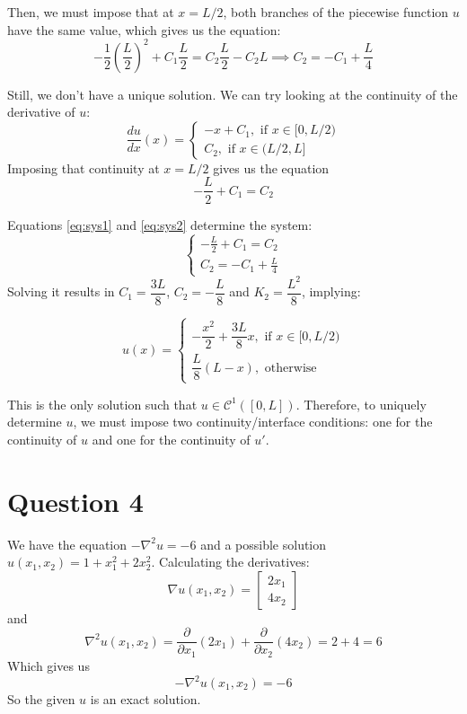 \documentclass[12pt]{article}
\begin{document}
    Then, we must impose that at $x=L/2$, both branches of the piecewise function $u$ have the same value, which gives us the equation:
    \begin{equation}
        \label{eq:sys1}
        -\frac{1}{2} \left(\frac{L}{2} \right)^2 + C_1\frac{L}{2} = C_2\frac{L}{2} - C_2L \implies C_2 = -C_1 + \frac{L}{4}
    \end{equation}

    Still, we don't have a unique solution. We can try looking at the continuity of the derivative of $u$:
    \[
        \frac{du}{dx}(x)= \begin{cases}
            -x + C_1, \text{ if }x \in [0,L/2) \\
            C_2, \text{ if }x \in (L/2,L]
        \end{cases}
    \]
    Imposing that continuity at $x=L/2$ gives us the equation
    \begin{equation}
    \label{eq:sys2}
        -\frac{L}{2} + C_1 = C_2
    \end{equation}

    Equations \ref{eq:sys1} and \ref{eq:sys2} determine the system:
    \begin{equation}
        \begin{cases}
            -\frac{L}{2} + C_1 = C_2 \\
            C_2 = -C_1 + \frac{L}{4}
        \end{cases}
    \end{equation}
    Solving it results in $C_1 = \dfrac{3L}{8}$, $C_2 = -\dfrac{L}{8}$ and $K_2 = \dfrac{L^2}{8}$, implying:

    \begin{equation}
        u(x) = \begin{cases}
            -\dfrac{x^2}{2} + \dfrac{3L}{8}x , \text{ if }x \in [0,L/2) \\
            \dfrac{L}{8}(L-x), \text{ otherwise}
        \end{cases} 
    \end{equation}

    This is the only solution such that $u \in \mathcal{C}^1([0,L])$. Therefore, to uniquely determine $u$, we must impose two continuity/interface conditions: one for the continuity of $u$ and one for the continuity of $u'$.

    \section*{Question 4}
    We have the equation $-\nabla^2u = -6$ and a possible solution $u(x_1,x_2)=1 +x_1^2 +2x_2^2$. Calculating the derivatives:
    \[
        \nabla u(x_1, x_2) = \begin{bmatrix}
            2x_1 \\
            4x_2
        \end{bmatrix}
    \]
    and
    \[
        \nabla^2u(x_1,x_2) = \frac{\partial}{\partial x_1}(2x_1) + \frac{\partial}{\partial x_2}(4x_2) = 2 + 4 = 6
    \]
    Which gives us
    \[
        -\nabla^2u(x_1,x_2) = -6
    \]
    So the given $u$ is an exact solution.
\end{document}
